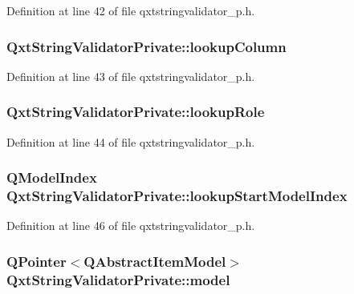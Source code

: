 Definition at line 42 of file qxtstringvalidator\-\_\-p.\-h.

\hypertarget{class_qxt_string_validator_private_ab90dc74ae7ecc766b35d7fe69544bc51}{
\subsubsection[{lookup\-Column}]{ Qxt\-String\-Validator\-Private\-::lookup\-Column}}\label{class_qxt_string_validator_private_ab90dc74ae7ecc766b35d7fe69544bc51}


Definition at line 43 of file qxtstringvalidator\-\_\-p.\-h.

\hypertarget{class_qxt_string_validator_private_aed669a706a65212f11d2e55cbb1b351d}{
\subsubsection[{lookup\-Role}]{ Qxt\-String\-Validator\-Private\-::lookup\-Role}}\label{class_qxt_string_validator_private_aed669a706a65212f11d2e55cbb1b351d}


Definition at line 44 of file qxtstringvalidator\-\_\-p.\-h.

\hypertarget{class_qxt_string_validator_private_ae5ee34fb372ef7dbeb2f162b4bb10fa8}{
\subsubsection[{lookup\-Start\-Model\-Index}]{\setlength{\rightskip}{0pt plus 5cm}Q\-Model\-Index Qxt\-String\-Validator\-Private\-::lookup\-Start\-Model\-Index}}\label{class_qxt_string_validator_private_ae5ee34fb372ef7dbeb2f162b4bb10fa8}


Definition at line 46 of file qxtstringvalidator\-\_\-p.\-h.

\hypertarget{class_qxt_string_validator_private_a94cd265a01040748ca24440293c6ac32}{
\subsubsection[{model}]{\setlength{\rightskip}{0pt plus 5cm}Q\-Pointer$<$Q\-Abstract\-Item\-Model$>$ Qxt\-String\-Validator\-Private\-::model}}\label{class_qxt_string_validator_private_a94cd265a01040748ca24440293c6ac32}


